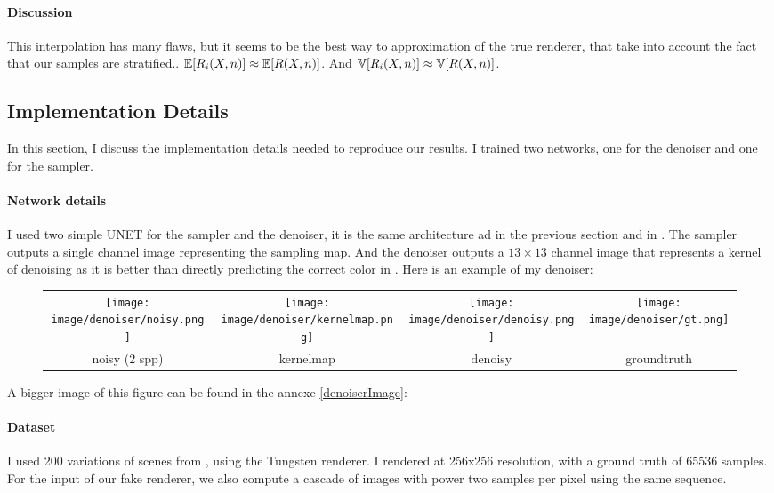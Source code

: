 \documentclass{classeENS}
\begin{document}
\paragraph*{Discussion} This interpolation has many flaws, but it seems to be 
 the best way to approximation of the true renderer, that take into 
 account the fact that our samples are stratified.. $\mathbb E[R_i(X,n)] \approx \mathbb E[R(X,n)]$. 
 And $\mathbb V[R_i(X,n)] \approx \mathbb V[R(X,n)]$.

\subsection{Implementation Details}

In this section, I discuss the implementation details needed to reproduce 
our results. I trained two networks, one for the denoiser and one 
for the sampler.

\paragraph*{Network details} I used two simple UNET for the sampler and the denoiser, 
it is the same architecture ad in the previous section and in \cite{kuznetsov2018deep}. 
The sampler outputs a single channel image representing the sampling map. And the denoiser
outputs a $13\times13$ channel image that represents a kernel of denoising as it 
is better than directly predicting the correct color in \cite{10.1145/3072959.3073708}. 
Here is an example of my denoiser:

\begin{figure}[H]
    \centering
    \begin{tabular}{cccc}
    \texttt{[image: image/denoiser/noisy.png]}
    & \texttt{[image: image/denoiser/kernelmap.png]}
    & \texttt{[image: image/denoiser/denoisy.png]}
    & \texttt{[image: image/denoiser/gt.png]} \\
    noisy (2 spp) & kernelmap & denoisy & groundtruth \\
    \end{tabular}
\end{figure}
A bigger image of this figure can be found in the annexe \ref{denoiserImage}:

\paragraph*{Dataset} I used 200 variations of scenes from \cite{resources16}, using 
the Tungsten renderer. I rendered at 256x256 resolution, with a ground 
truth of 65536 samples. For the input of our fake renderer, we also 
compute a cascade of images with power two samples per pixel using the 
same sequence.
\end{document}

